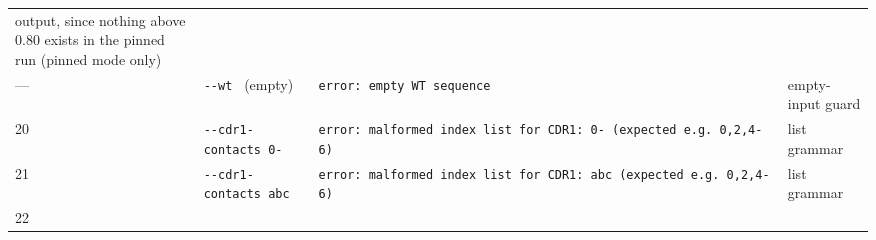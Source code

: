 \begin{longtable}[]{@{}llll@{}}
\begin{minipage}[t]{0.22\columnwidth}
output, since nothing above 0.80 exists in the pinned run (pinned mode
only)\strut
\end{minipage}\tabularnewline
\begin{minipage}[t]{0.22\columnwidth}\raggedright
---\strut
\end{minipage} & \begin{minipage}[t]{0.22\columnwidth}\raggedright
\texttt{-\/-wt\ \textquotesingle{}\textquotesingle{}} (empty)\strut
\end{minipage} & \begin{minipage}[t]{0.22\columnwidth}\raggedright
\texttt{error:\ empty\ WT\ sequence}\strut
\end{minipage} & \begin{minipage}[t]{0.22\columnwidth}\raggedright
empty-input guard\strut
\end{minipage}\tabularnewline
\begin{minipage}[t]{0.22\columnwidth}\raggedright
20\strut
\end{minipage} & \begin{minipage}[t]{0.22\columnwidth}\raggedright
\texttt{-\/-cdr1-contacts\ 0-}\strut
\end{minipage} & \begin{minipage}[t]{0.22\columnwidth}\raggedright
\texttt{error:\ malformed\ index\ list\ for\ CDR1:\ \textquotesingle{}0-\textquotesingle{}\ (expected\ e.g.\ 0,2,4-6)}\strut
\end{minipage} & \begin{minipage}[t]{0.22\columnwidth}\raggedright
list grammar\strut
\end{minipage}\tabularnewline
\begin{minipage}[t]{0.22\columnwidth}\raggedright
21\strut
\end{minipage} & \begin{minipage}[t]{0.22\columnwidth}\raggedright
\texttt{-\/-cdr1-contacts\ abc}\strut
\end{minipage} & \begin{minipage}[t]{0.22\columnwidth}\raggedright
\texttt{error:\ malformed\ index\ list\ for\ CDR1:\ \textquotesingle{}abc\textquotesingle{}\ (expected\ e.g.\ 0,2,4-6)}\strut
\end{minipage} & \begin{minipage}[t]{0.22\columnwidth}\raggedright
list grammar\strut
\end{minipage}\tabularnewline
\begin{minipage}[t]{0.22\columnwidth}\raggedright
22\strut
\end{minipage} & \begin{minipage}[t]{0.22\columnwidth}\raggedright

\end{minipage}
\end{longtable}
